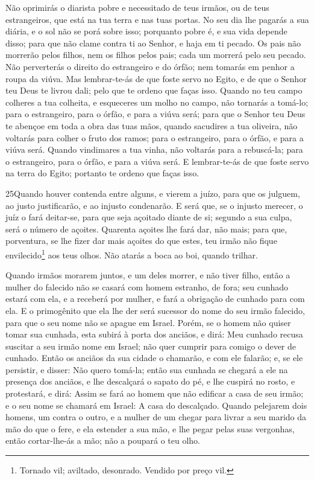Não oprimirás o diarista pobre e necessitado de teus irmãos, ou
de teus estrangeiros, que está na tua terra e nas tuas portas.
No seu dia lhe pagarás a sua diária, e o sol não se porá
sobre isso; porquanto pobre é, e sua vida depende disso; para que
não clame contra ti ao Senhor, e haja em ti pecado. Os pais
não morrerão pelos filhos, nem os filhos pelos pais; cada um morrerá
pelo seu pecado. Não perverterás o direito do estrangeiro e
do órfão; nem tomarás em penhor a roupa da viúva. Mas
lembrar-te-ás de que foste servo no Egito, e de que o Senhor teu
Deus te livrou dali; pelo que te ordeno que faças isso.
Quando no teu campo colheres a tua colheita, e esqueceres um
molho no campo, não tornarás a tomá-lo; para o estrangeiro, para o
órfão, e para a viúva será; para que o Senhor teu Deus te abençoe em
toda a obra das tuas mãos, quando sacudires a tua oliveira,
não voltarás para colher o fruto dos ramos; para o estrangeiro, para
o órfão, e para a viúva será. Quando vindimares a tua vinha,
não voltarás para a rebuscá-la; para o estrangeiro, para o órfão, e
para a viúva será. E lembrar-te-ás de que foste servo na
terra do Egito; portanto te ordeno que faças isso.

\medskip

\lettrine{25} Quando houver contenda entre alguns, e vierem a
juízo, para que os julguem, ao justo justificarão, e ao injusto
condenarão. E será que, se o injusto merecer, o juíz o fará
deitar-se, para que seja açoitado diante de si; segundo a sua culpa,
será o número de açoites. Quarenta açoites lhe fará dar, não
mais; para que, porventura, se lhe fizer dar mais açoites do que
estes, teu irmão não fique envilecido\footnote{Tornado vil;
aviltado, desonrado. Vendido por preço vil.} aos teus olhos. Não
atarás a boca ao boi, quando trilhar.

Quando irmãos morarem juntos, e um deles morrer, e não tiver
filho, então a mulher do falecido não se casará com homem estranho,
de fora; seu cunhado estará com ela, e a receberá por mulher, e fará
a obrigação de cunhado para com ela. E o primogênito que ela lhe
der será sucessor do nome do seu irmão falecido, para que o seu nome
não se apague em Israel. Porém, se o homem não quiser tomar sua
cunhada, esta subirá à porta dos anciãos, e dirá: Meu cunhado recusa
suscitar a seu irmão nome em Israel; não quer cumprir para comigo o
dever de cunhado. Então os anciãos da sua cidade o chamarão, e
com ele falarão; e, se ele persistir, e disser: Não quero tomá-la;
então sua cunhada se chegará a ele na presença dos anciãos, e
lhe descalçará o sapato do pé, e lhe cuspirá no rosto, e protestará,
e dirá: Assim se fará ao homem que não edificar a casa de seu irmão;
e o seu nome se chamará em Israel: A casa do descalçado.
Quando pelejarem dois homens, um contra o outro, e a mulher
de um chegar para livrar a seu marido da mão do que o fere, e ela
estender a sua mão, e lhe pegar pelas suas vergonhas, então
cortar-lhe-ás a mão; não a poupará o teu olho.


